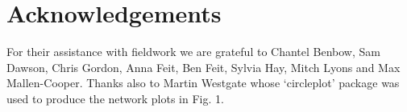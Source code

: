 \section*{Acknowledgements}

For their assistance with fieldwork we are grateful to Chantel Benbow, Sam Dawson, Chris Gordon, Anna Feit, Ben Feit, Sylvia Hay, Mitch Lyons and Max Mallen-Cooper. Thanks also to Martin Westgate whose `circleplot' package was used to produce the network plots in Fig. 1.

\newpage


